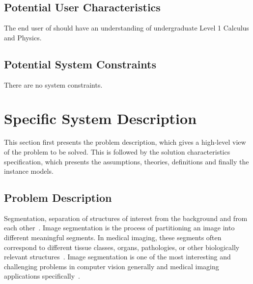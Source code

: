 \documentclass[12pt]{article}
\begin{document}
\begin{center}
\label{fg_syscontext}
\end{center}

\subsection{Potential User Characteristics} \label{sec_UserCharacteristics}

The end user of \progname{} should have an understanding of undergraduate Level
1 Calculus and Physics.

\subsection{Potential System Constraints}

There are no system constraints.

\section{Specific System Description}
This section first presents the problem description, which gives a high-level
view of the
problem to be solved. This is followed by the solution characteristics
specification, which
presents the assumptions, theories, definitions and finally the instance
models.\subsection{Problem Description} \label{sec_ProblemDes}
Segmentation, separation of structures of interest from the background and from
each other~\cite{Bankman2000}. Image segmentation is the process of
partitioning an image into different meaningful segments. In medical imaging,
these segments
often correspond to different tissue classes, organs, pathologies, or other
biologically relevant structures~\cite{Forouzanfar2010}. Image segmentation is
one of the most interesting and challenging problems in computer vision
generally and medical imaging applications specifically~\cite{Elnakib2011}.
\end{document}
